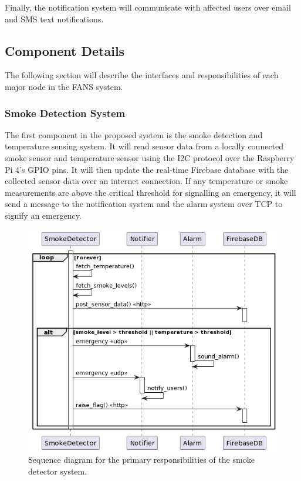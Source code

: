 Finally, the notification system will communicate with affected users over email and SMS text notifications.

\subsection{Component Details}

The following section will describe the interfaces and responsibilities of each major node in the FANS system.

\subsubsection{Smoke Detection System}

The first component in the proposed system is the smoke detection and temperature sensing system. It will read sensor
data from a locally connected smoke sensor and temperature sensor using the I2C protocol over the Raspberry Pi 4's GPIO
pins. It will then update the real-time Firebase database with the collected sensor data over an internet connection.
If any temperature or smoke measurements are above the critical threshold for signalling an emergency, it will send a
message to the notification system and the alarm system over TCP to signify an emergency.

\begin{figure}[H]
    \centering
    \includegraphics[width=5in]{../assets/SmokeDetectorSequence.png}
    \caption{Sequence diagram for the primary responsibilities of the smoke detector system.}
\end{figure}

